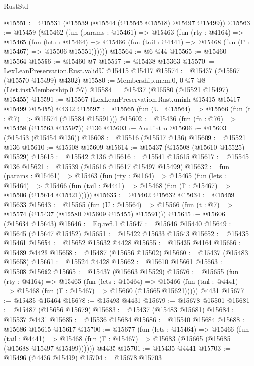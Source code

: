 \begin{lexlean}{RustStd}
\begin{coremodule}
@15551 := @15531 (@15539 (@15544 (@15545 @15518) @15497 @15499))
@15563 := @15459
    (@15462
      (fun (params : @15461) =>
      @15463
        (fun (rty : @4164) =>
        @15465
          (fun (lets : @15464) =>
          @15466 (fun (tail : @4441) => @15468 (fun (Γ : @15467) => @15506 @15551))))))
@15564 := @6 @44
@15565 := @15460 @15564
@15566 := @15460 @7
@15567 := @15438 @15363
@15570 := LexLeanPreservation.Rust.validU @15415 @15417
@15574 := @15437 (@15567 (@15570 @15499) @4302)
@15580 := Membership.mem.{0, 0} @7 @8 (List.instMembership.{0} @7)
@15584 := @15437 (@15580 (@15521 @15497) @15455)
@15591 := @15567 (LexLeanPreservation.Rust.uninh @15415 @15417 @15499 @15455) @4302
@15597 := @15565 (fun (U : @15564) => @15566 (fun (t : @7) => @15574 (@15584 @15591)))
@15602 := @15436 (fun (fn : @76) => @15458 (@15563 @15597)) @136
@15603 := And.intro
@15606 := @15603 (@15453 (@15454 @136))
@15608 := @15516 (@15517 @136)
@15609 := @15521 @136
@15610 := @15608 @15609
@15614 := @15437 (@15508 (@15610 @15525) @15529)
@15615 := @15542 @136
@15616 := @15541 @15615
@15617 := @15545 @136
@15621 := @15539 (@15616 @15617 @15497 @15499)
@15632 := fun (params : @15461) =>
  @15463
    (fun (rty : @4164) =>
    @15465
      (fun (lets : @15464) =>
      @15466 (fun (tail : @4441) => @15468 (fun (Γ : @15467) => @15506 (@15614 @15621)))))
@15633 := @15462 @15632
@15634 := @15459 @15633
@15643 := @15565
    (fun (U : @15564) => @15566 (fun (t : @7) => @15574 (@15437 (@15580 @15609 @15455) @15591)))
@15645 := @15606 (@15634 @15643)
@15646 := Eq.refl.{1}
@15647 := @15646 @15440
@15649 := @15645 (@15647 @15452)
@15651 := @15422 @15633 @15643
@15652 := @15435 @15461
@15654 := @15652 @15632 @4428
@15655 := @15435 @4164
@15656 := @15489 @4428
@15658 := @15487 (@15656 @15502)
@15660 := @15437 (@15483 @15658)
@15661 := @15524 @4428
@15662 := @15610 @15661
@15663 := @15508 @15662
@15665 := @15437 (@15663 @15529)
@15676 := @15655
    (fun (rty : @4164) =>
    @15465
      (fun (lets : @15464) =>
      @15466 (fun (tail : @4441) => @15468 (fun (Γ : @15467) => @15660 (@15665 @15621)))))
    @4431
@15677 := @15435 @15464
@15678 := @15493 @4431
@15679 := @15678 @15501
@15681 := @15487 (@15656 @15679)
@15683 := @15437 (@15483 @15681)
@15684 := @15537 @4431
@15685 := @15536 @15684
@15686 := @15540 @15684
@15688 := @15686 @15615 @15617
@15700 := @15677
    (fun (lets : @15464) =>
    @15466
      (fun (tail : @4441) =>
      @15468 (fun (Γ : @15467) => @15683 (@15665 (@15685 (@15688 @15497 @15499))))))
    @4435
@15701 := @15435 @4441
@15703 := @15496 (@4436 @15499)
@15704 := @15678 @15703

\end{coremodule}
\end{lexlean}
